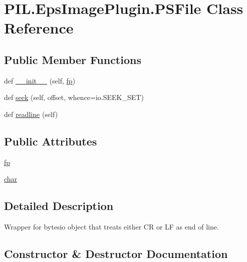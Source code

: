 \hypertarget{classPIL_1_1EpsImagePlugin_1_1PSFile}{}\section{P\+I\+L.\+Eps\+Image\+Plugin.\+P\+S\+File Class Reference}
\label{classPIL_1_1EpsImagePlugin_1_1PSFile}
\subsection*{Public Member Functions}
\begin{DoxyCompactItemize}
\item 
def \hyperlink{classPIL_1_1EpsImagePlugin_1_1PSFile_af61bf2ab7a188462365f122941085792}{\+\_\+\+\_\+init\+\_\+\+\_\+} (self, \hyperlink{classPIL_1_1EpsImagePlugin_1_1PSFile_a37bce379c2c981d55484090611e67719}{fp})
\item 
def \hyperlink{classPIL_1_1EpsImagePlugin_1_1PSFile_a13c2b0cdd10df857b9721d9bf0a6135f}{seek} (self, offset, whence=io.\+S\+E\+E\+K\+\_\+\+S\+ET)
\item 
def \hyperlink{classPIL_1_1EpsImagePlugin_1_1PSFile_a4e996633c7c8b1b955ae6111fb9de702}{readline} (self)
\end{DoxyCompactItemize}
\subsection*{Public Attributes}
\begin{DoxyCompactItemize}
\item 
\hyperlink{classPIL_1_1EpsImagePlugin_1_1PSFile_a37bce379c2c981d55484090611e67719}{fp}
\item 
\hyperlink{classPIL_1_1EpsImagePlugin_1_1PSFile_a9afeb1767512f1d3ff264d8702d44abe}{char}
\end{DoxyCompactItemize}


\subsection{Detailed Description}
\begin{DoxyVerb}Wrapper for bytesio object that treats either CR or LF as end of line.
\end{DoxyVerb}
 

\subsection{Constructor \& Destructor Documentation}
\mbox{\label{classPIL_1_1EpsImagePlugin_1_1PSFile_af61bf2ab7a188462365f122941085792}} 
